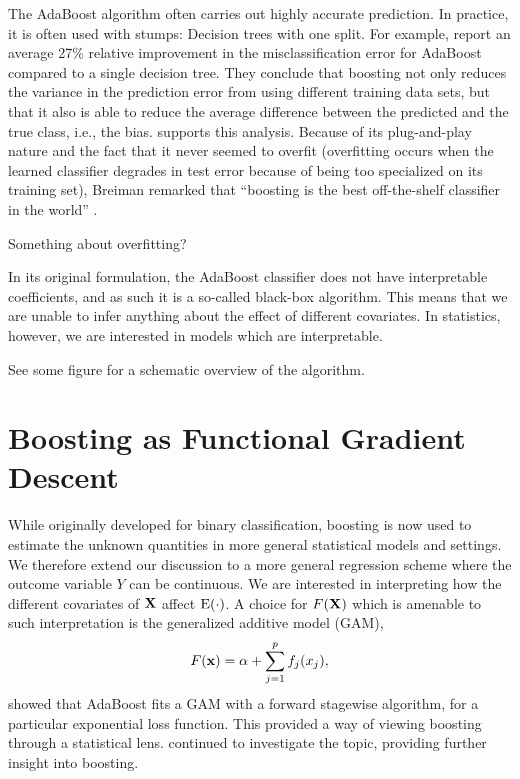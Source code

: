 The AdaBoost algorithm often carries out highly accurate prediction. In practice, it is often used with stumps: Decision trees with one split. For example, \citet{bauer-kohavi} report an average 27\% relative improvement in the misclassification error for AdaBoost compared to a single decision tree. They conclude that boosting not only reduces the variance in the prediction error from using different training data sets, but that it also is able to reduce the average difference between the predicted and the true class, i.e., the bias. \citet{breiman1998} supports this analysis. Because of its plug-and-play nature and the fact that it never seemed to overfit (overfitting occurs when the learned classifier degrades in test error because of being too specialized on its training set), Breiman remarked that ``boosting is the best off-the-shelf classifier in the world'' \citep{ESL}.

Something about overfitting?

In its original formulation, the AdaBoost classifier does not have interpretable coefficients, and as such it is a so-called black-box algorithm. This means that we are unable to infer anything about the effect of different covariates. In statistics, however, we are interested in models which are interpretable.

See some figure for a schematic overview of the algorithm.

\section{Boosting as Functional Gradient Descent}
While originally developed for binary classification, boosting is now used to estimate the unknown quantities in more general statistical models and settings. We therefore extend our discussion to a more general regression scheme where the outcome variable $Y$ can be continuous. We are interested in interpreting how the different covariates of $\mathbf{X}$ affect $\operatorname{E}(\cdot)$. A choice for $F(\mathbf{X})$ which is amenable to such interpretation is the generalized additive model (GAM),
\begin{equation}\label{eq:gam}
    F(\mathbf{x})=\alpha+\sum_{j=1}^pf_j(x_j),
\end{equation}
\citet{friedman2000} showed that AdaBoost fits a GAM with a forward stagewise algorithm, for a particular exponential loss function. This provided a way of viewing boosting through a statistical lens. \citet{friedman2001} continued to investigate the topic, providing further insight into boosting.

